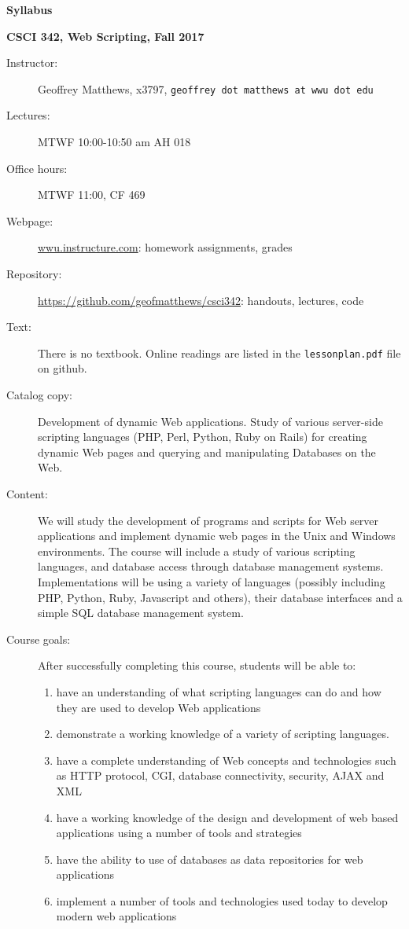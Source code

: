 \documentclass{article}
\begin{document}
\centerline{\large \bf Syllabus}

\centerline{\bf CSCI 342, Web Scripting, Fall 2017}

\begin{description}

\item[Instructor:] Geoffrey Matthews, x3797, {\tt geoffrey dot
  matthews at wwu dot edu}
\item[Lectures:] MTWF 10:00-10:50 am AH 018
\item[Office hours:] MTWF 11:00, CF 469
\item[Webpage:] \url{wwu.instructure.com}: homework assignments,
  grades
\item[Repository:] \url{https://github.com/geofmatthews/csci342}:
  handouts, lectures, code
\item[Text:] There is no textbook. Online readings are listed in the
  {\tt lessonplan.pdf} file on github.

\item[Catalog copy:] Development of dynamic Web applications. Study of
  various server-side scripting languages (PHP, Perl, Python, Ruby on
  Rails) for creating dynamic Web pages and querying and manipulating
  Databases on the Web.

\item[Content:] We will study the development of programs and scripts
for Web server applications and implement dynamic web pages in the
Unix and Windows environments.  The course will include a study of
various scripting languages, and database access through database
management systems.  Implementations will be using a variety of
languages (possibly including PHP, Python, Ruby, Javascript and
others), their database interfaces and a simple SQL database
management system.

\item[Course goals:] After successfully completing this course,
  students will be able to:
  \begin{enumerate}
  \item have an understanding of what scripting languages can do and
    how they are used to develop Web applications
  \item
    demonstrate a working knowledge of a variety of scripting
    languages.
  \item
    have a complete understanding of Web concepts and technologies
    such as HTTP protocol, CGI, database connectivity, security, AJAX
    and XML
  \item have a working knowledge of the design and development of web
    based applications using a number of tools and strategies
  \item have the ability to use of databases as data repositories for
    web applications
  \item implement a number of tools and technologies used today to
    develop modern web applications
  \end{enumerate}
  

\end{description}
\end{document}
